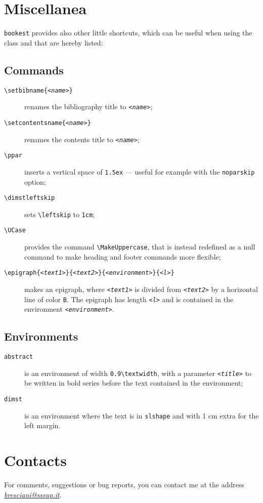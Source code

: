 \documentclass[a4paper,oneside,centered,noparindent,noparskip]{bookest}
\begin{document}
\section{Miscellanea}
\texttt{bookest} provides also other little shortcuts, which can be useful when using the class and that are hereby listed:

\subsection{Commands}
\begin{description}
 \item[\texttt{\textbackslash setbibname\{\textit{<name>}\}}] renames the bibliography title to \texttt{\textit{<name>}};
 \item[\texttt{\textbackslash setcontentsname\{\textit{<name>}\}}] renames the contents title to \texttt{\textit{<name>}};
 \item[\texttt{\textbackslash ppar}] inserts a vertical space of \texttt{1.5ex} --- useful for example with the \texttt{noparskip} option;
 \item[\texttt{\textbackslash dimstleftskip}] sets \texttt{\textbackslash leftskip} to \texttt{1cm};
 \item[\texttt{\textbackslash UCase}] provides the command \texttt{\textbackslash MakeUppercase}, that is instead redefined as a null command to make heading and footer commands more flexible;
 \item[\texttt{\textbackslash epigraph\{\textit{<text1>}\}\{\textit{<text2>}\}\{\textit{<environment>}\}\{\textit{<l>}\}}] makes an epigraph, where \texttt{\textit{<text1>}} is divided from \texttt{\textit{<text2>}} by a horizontal line of color \texttt{B}. The epigraph has length \texttt{\textit{<l>}} and is contained in the environment \texttt{\textit{<environment>}}.
\end{description}

\subsection{Environments}
\begin{description}
 \item[\texttt{abstract}] is an environment of width \texttt{0.9\textbackslash textwidth}, with a parameter \texttt{\textit{<title>}} to be written in bold series before the text contained in the environment;
 \item[\texttt{dimst}] is an environment where the text is in \texttt{slshape} and with 1 cm extra for the left margin.
\end{description}

\section{Contacts}
For comments, suggestions or bug reports, you can contact me at the address \href{mailto:bresciani@sssup.it}{\textit{bresciani@sssup.it}}.
\end{document}
